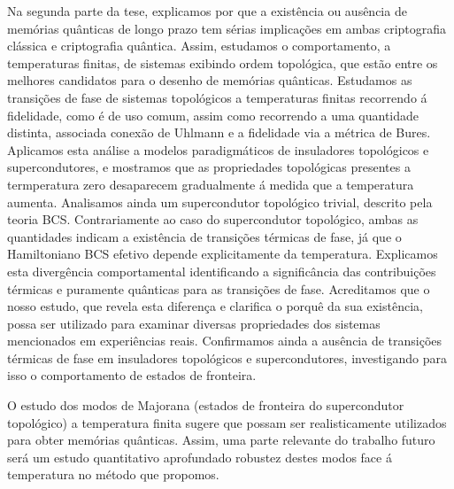 \documentclass[11pt]{report}
\begin{document}
Na segunda parte da tese, explicamos por que a exist\^{e}ncia ou aus\^{e}ncia de mem\'{o}rias qu\^{a}nticas de longo prazo tem s\'{e}rias implica\c{c}\~{o}es em ambas criptografia cl\'{a}ssica e criptografia qu\^{a}ntica. Assim, estudamos o comportamento, a temperaturas finitas, de sistemas exibindo ordem topol\'{o}gica, que est\~{a}o entre os melhores candidatos para o desenho de mem\'{o}rias qu\^{a}nticas. Estudamos as transi\c{c}\~{o}es de fase de sistemas topol\'{o}gicos a temperaturas finitas recorrendo \'{a} fidelidade, como \'{e} de uso comum, assim como recorrendo a uma quantidade distinta, associada  conex\~{a}o de Uhlmann e a fidelidade via a m\'{e}trica de Bures. Aplicamos esta an\'{a}lise a modelos paradigm\'{a}ticos de insuladores topol\'{o}gicos e supercondutores, e mostramos que as propriedades topol\'{o}gicas presentes a termperatura zero desaparecem gradualmente \'{a} medida que a temperatura aumenta. Analisamos ainda um supercondutor topol\'{o}gico trivial, descrito pela teoria BCS. Contrariamente ao caso do supercondutor topol\'{o}gico, ambas as quantidades indicam a exist\^{e}ncia de transi\c{c}\~{o}es t\'{e}rmicas de fase, j\'{a} que o Hamiltoniano BCS efetivo depende explicitamente da temperatura. Explicamos esta diverg\^{e}ncia comportamental identificando a signific\^{a}ncia das contribui\c{c}\~{o}es t\'{e}rmicas e puramente qu\^{a}nticas para as transi\c{c}\~{o}es de fase. Acreditamos que o nosso estudo, que revela esta diferen\c{c}a e clarifica o porqu\^{e} da sua exist\^{e}ncia, possa ser utilizado para examinar diversas propriedades dos sistemas mencionados em experi\^{e}ncias reais. Confirmamos ainda a aus\^{e}ncia de transi\c{c}\~{o}es t\'{e}rmicas de fase em insuladores topol\'{o}gicos e supercondutores, investigando para isso o comportamento de estados de fronteira.

O estudo dos modos de Majorana (estados de fronteira do supercondutor topol\'{o}gico) a temperatura finita sugere que possam ser realisticamente utilizados para obter mem\'{o}rias qu\^{a}nticas. Assim, uma parte relevante do trabalho futuro ser\'{a} um estudo quantitativo aprofundado robustez destes modos face \'{a} temperatura no m\'{e}todo que propomos.
\end{document}
